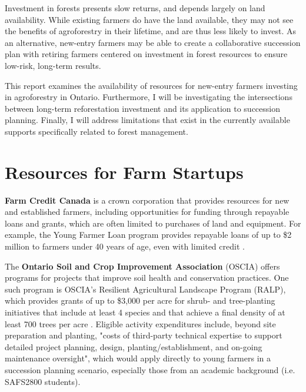 \documentclass{report}
\begin{document}

\hspace{24pt}Investment in forests presents slow returns, and depends largely on land availability. While existing farmers do have the land available, they may not see the benefits of agroforestry in their lifetime, and are thus less likely to invest. As an alternative, new-entry farmers may be able to create a collaborative succession plan with retiring farmers centered on investment in forest resources to ensure low-risk, long-term results. 

\hspace{24pt}This report examines the availability of resources for new-entry farmers investing in agroforestry in Ontario. Furthermore, I will be investigating the intersections between long-term reforestation investment and its application to succession planning. Finally, I will address limitations that exist in the currently available supports specifically related to forest management.

\clearpage

\section{Resources for Farm Startups}

\hspace{24pt}\textbf{Farm Credit Canada} is a crown corporation that provides resources for new and established farmers, including opportunities for funding through repayable loans and grants, which are often limited to purchases of land and equipment. For example, the Young Farmer Loan program provides repayable loans of up to \$2 million to farmers under 40 years of age, even with limited credit \parencite{fcc_youngfarmers}.

\hspace{24pt}The \textbf{Ontario Soil and Crop Improvement Association} (OSCIA) offers programs for projects that improve soil health and conservation practices. One such program is OSCIA's Resilient Agricultural Landscape Program (RALP), which provides grants of up to \$3,000 per acre for shrub- and tree-planting initiatives that include at least 4 species and that achieve a final density of at least 700 trees per acre \parencite{oscp_ralp}. Eligible activity expenditures include, beyond site preparation and planting, "costs of third-party technical expertise to support detailed project planning, design, planting/establishment, and on-going maintenance oversight", which would apply directly to young farmers in a succession planning scenario, especially those from an academic background (i.e. SAFS2800 students).
\end{document}
